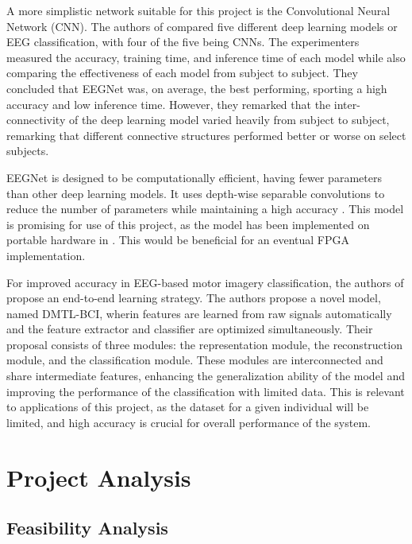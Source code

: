 \documentclass[conference]{IEEEtran}
\begin{document}
    A more simplistic network suitable for this project is the Convolutional Neural Network (CNN). The authors of \cite{deep_learning_eeg} compared five different deep learning models or EEG classification, with four of the five being CNNs. The experimenters measured the accuracy, training time, and inference time of each model while also comparing the effectiveness of each model from subject to subject. They concluded that EEGNet was, on average, the best performing, sporting a high accuracy and low inference time. However, they remarked that the inter-connectivity of the deep learning model varied heavily from subject to subject, remarking that different connective structures performed better or worse on select subjects. 

    EEGNet is designed to be computationally efficient, having fewer parameters than other deep learning models. It uses depth-wise separable convolutions to reduce the number of parameters while maintaining a high accuracy \cite{eegnet}. This model is promising for use of this project, as the model has been implemented on portable hardware in \cite{eegnet_processor_design}. This would be beneficial for an eventual FPGA implementation. 

    For improved accuracy in EEG-based motor imagery classification, the authors of \cite{dmtl_bci} propose an end-to-end learning strategy. The authors propose a novel model, named DMTL-BCI, wherin features are learned from raw signals automatically and the feature extractor and classifier are optimized simultaneously. Their proposal consists of three modules: the representation module, the reconstruction module, and the classification module. These modules are interconnected and share intermediate features, enhancing the generalization ability of the model and improving the performance of the classification with limited data. This is relevant to applications of this project, as the dataset for a given individual will be limited, and high accuracy is crucial for overall performance of the system. 
    

\section{Project Analysis}
    \subsection{Feasibility Analysis}\label{}
\end{document}
